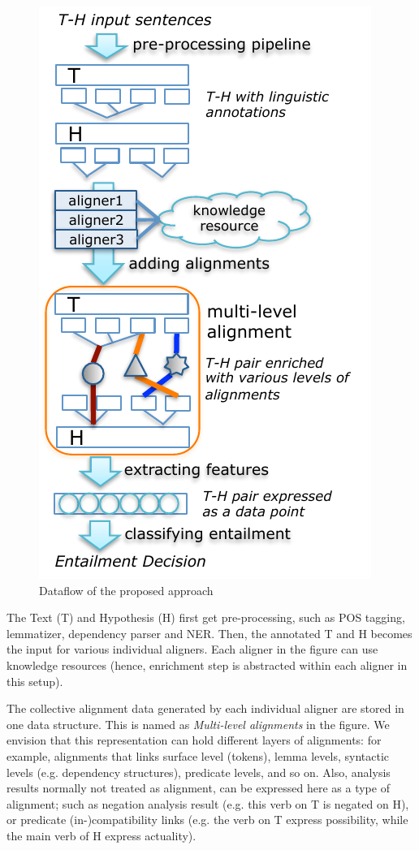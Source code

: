 \documentclass[11pt,letterpaper]{article}
\begin{document}
\begin{figure}[t!b]
  \centering
  \includegraphics[width=0.9\columnwidth]{figures/figure1.pdf}
  \caption{Dataflow of the proposed approach}
  \label{fig:1}
\end{figure}

The Text (T) and Hypothesis (H) first get pre-processing, such as
POS tagging, lemmatizer, dependency parser and NER. Then, the 
annotated T and H becomes the input for various individual
aligners. Each aligner in the figure can use knowledge resources 
(hence, enrichment step is abstracted within each aligner in
this setup).

The collective alignment data generated by each individual aligner are
stored in one data structure. This is named as {\em Multi-level
  alignments} in the figure. We envision that this representation can
hold different layers of alignments: for example, alignments that
links surface level (tokens), lemma levels, syntactic levels
(e.g. dependency structures), predicate levels, and so on. Also,
analysis results normally not treated as alignment, can be expressed
here as a type of alignment; such as negation analysis result
(e.g. this verb on T is negated on H), or predicate (in-)compatibility
links (e.g. the verb on T express possibility, while the main verb of
H express actuality). 
\end{document}
